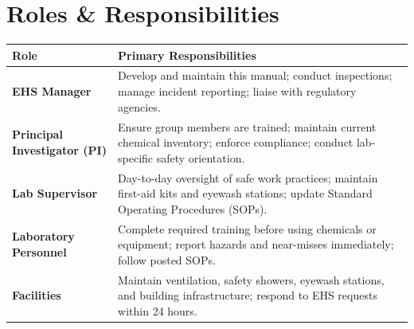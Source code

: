 \section{Roles \& Responsibilities}

\begin{tabularx}{\linewidth}{@{}>{\color{accent}\bfseries}l@{\hspace{8mm}}>{\raggedright\arraybackslash}X@{}}
  \toprule
  Role & Primary Responsibilities \\
  \midrule
  EHS Manager         & Develop and maintain this manual; conduct inspections; manage incident
                        reporting; liaise with regulatory agencies. \\[4pt]
  Principal Investigator (PI) & Ensure group members are trained; maintain current chemical
                        inventory; enforce compliance; conduct lab-specific safety orientation. \\[4pt]
  Lab Supervisor      & Day-to-day oversight of safe work practices; maintain first-aid kits
                        and eyewash stations; update Standard Operating Procedures (SOPs). \\[4pt]
  Laboratory Personnel & Complete required training before using chemicals or equipment; report
                        hazards and near-misses immediately; follow posted SOPs. \\[4pt]
  Facilities          & Maintain ventilation, safety showers, eyewash stations, and building
                        infrastructure; respond to EHS requests within 24 hours. \\
  \bottomrule
\end{tabularx}

